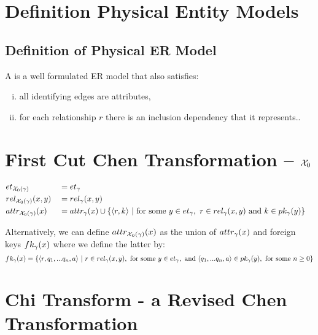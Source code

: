 \section{Definition Physical Entity Models}
	


\subsection{Definition of Physical ER Model}
\begin{definition}
\noindent 
A  is a well formulated ER model that also satisfies:
\begin{enumerate}[(i)]
\item
all identifying edges are attributes, 

\item
for each relationship $r$ there is  an inclusion dependency that it represents..
\end{enumerate} 
\end{definition}


\section{First Cut Chen Transformation -- $\chiZero$}

\begin{align}
&\et[\chiZeroM]        && = \et        && \\
&\rel[\chiZeroM]{x}{y} && = \rel{x}{y}  &&\\
&\attr[\chiZeroM]{x}   && = \attr{x}  \cup  \setsuchthat{\tuple{r,k}}{\text{for some }
			                  y \in \et, \ r \in \rel{x}{y} \text{ and } k \in \pk{y}} 
\end{align}

Alternatively, we can define $\attr[\chiZeroM]{x}$ as the union of $\attr{x}$ and foreign keys $\fk{x}$
where we define the latter by:
\begin{equation}
\fk{x} = \setsuchthat{\tuple{r,q_1,...q_n,a}}
                               {r \in \rel{x}{y},
                                  \text{ for some } y \in \et,
																	\text{ and } \tuple{q_1,...q_n,a} \in \pk{y},
																	\text{ for some } n \geq 0
			                   }
\end{equation}

\section{Chi Transform - a Revised Chen Transformation}

